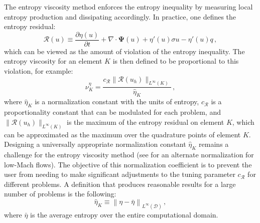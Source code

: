 \documentclass[xchauthor,chkrefs,fixeqskip,GCNS,amsmath,amsthm]{yjcphg}
\theoremstyle{remark}
\begin{document}
The entropy viscosity method enforces the entropy inequality by
measuring local entropy production and dissipating accordingly. In
practice, one defines the entropy residual:
%
\begin{equation}
\mathcal{R}(u) \equiv\frac{\partial\eta(u)}{\partial t} + \nabla
\cdot\bm{\Psi}(u)
+ \eta'(u)\sigma u - \eta'(u)q \,,
\end{equation}
%
which can be viewed as the amount of violation of the entropy
inequality. The entropy viscosity for an element $K$ is then defined to
be proportional to this violation, for example:
%
\begin{equation}
\nu^{\eta}_{K} = \frac{c_{\mathcal{R}}\|\mathcal{R}(u_{h})\|_{L^{
\infty}(K)}}{\hat{\eta}_{K}}
\,,
\end{equation}
%
where $\hat{\eta}_{K}$ is a normalization constant with the units of
entropy, $c_{\mathcal{R}}$ is a proportionality constant that can be
modulated for each problem, and
$\|\mathcal{R}(u_{h})\|_{L^{\infty}(K)}$ is the maximum of the entropy
residual on element $K$, which can be approximated as the maximum over
the quadrature points of element $K$. Designing a universally
appropriate normalization constant $\hat{\eta}_{K}$ remains a challenge
for the entropy viscosity method (see \cite{marco_low_mach} for
an alternate normalization for low-Mach flows). The objective of this
normalization coefficient is to prevent the user from needing to make
significant adjustments to the tuning parameter $c_{\mathcal{R}}$ for
different problems. A definition that produces reasonable results for
a large number of problems is the following:
%
\begin{equation}
\hat{\eta}_{K} \equiv\left\| \eta-\bar{\eta}\right\|
_{L^{\infty}(
\mathcal{D})} \,,
\end{equation}
%
where $\bar{\eta}$ is the average entropy over the entire computational
domain.
\end{document}
